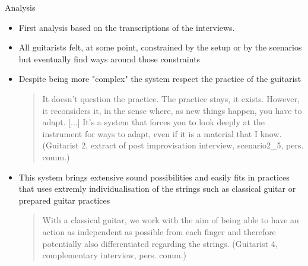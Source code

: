 \documentclass[final]{beamer}
\newlength{\onecolwid}
\newcommand{\fatskip}{\vspace{3cm}}
\begin{document}
\begin{frame}[t]
\begin{columns}[t]
\begin{column}{\onecolwid}
\fatskip
\begin{block}{Analysis}
\begin{itemize}
    \item First analysis based on the transcriptions of the interviews.
    \item All guitarists felt, at some point, constrained by the setup or by the scenarios but eventually find ways around those constraints
    \item Despite being more "complex" the system respect the practice of the guitarist\\ 
    \begin{quote}
     It doesn't question the practice. The practice stays, it exists. However, it reconsiders it, in the sense where, as new things happen, you have to adapt. [...] It's a system that forces you to look deeply at the instrument for ways to adapt, even if it is a material that I know. (Guitarist 2, extract of post improvisation interview, scenario2\_5, pers. comm.)
    \end{quote}
    \item This system brings extensive sound possibilities and easily fits in practices that uses extremly individualisation of the strings such as classical guitar or prepared guitar practices\\ 
\begin{quote}
With a classical guitar, we work with the aim of being able to have an action as independent as possible from each finger and therefore potentially also differentiated regarding the strings. (Guitarist 4, complementary interview, pers. comm.)
\end{quote}
\end{itemize}


    

    



\end{block}
\end{column}
\end{columns}
\end{frame}
\end{document}

